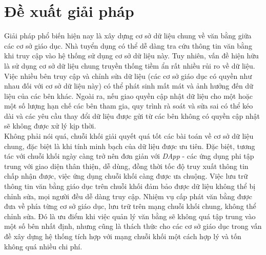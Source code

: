 \section{Đề xuất giải pháp}

Giải pháp phổ biến hiện nay là xây dựng cơ sở dữ liệu chung về văn bằng giữa các cơ sở giáo dục. Nhà tuyển dụng có thể dễ dàng tra cứu thông tin văn bằng khi truy cập vào hệ thống sử dụng cơ sở dữ liệu này. Tuy nhiên, vấn đề hiện hữu là sử dụng cơ sở dữ liệu chung truyền thống tiềm ẩn rất nhiều rủi ro về dữ liệu. Việc nhiều bên truy cập và chỉnh sửa dữ liệu (các cơ sở giáo dục có quyền như nhau đối với cơ sở dữ liệu này) có thể phát sinh mất mát và ảnh hưởng đến dữ liệu của các bên khác. Ngoài ra, nếu giao quyền cập nhật dữ liệu cho một hoặc một số lượng hạn chế các bên tham gia, quy trình rà soát và sửa sai có thể kéo dài và các yêu cầu thay đổi dữ liệu được gửi từ các bên không có quyền cập nhật sẽ không được xử lý kịp thời.\\

Không phải nói quá, chuỗi khối giải quyết quá tốt các bài toán về cơ sở dữ liệu chung, đặc biệt là khi tính minh bạch của dữ liệu được ưu tiên. Đặc biệt, tương tác với chuỗi khối ngày càng trở nên đơn giản với \textit{DApp} - các ứng dụng phi tập trung với giao diện thân thiện, dễ dùng, đồng thời tốc độ truy xuất thông tin chấp nhận được, việc ứng dụng chuỗi khối càng được ưa chuộng. Việc lưu trữ thông tin văn bằng giáo dục trên chuỗi khối đảm bảo được dữ liệu không thể bị chỉnh sửa, mọi người đều dễ dàng truy cập. Nhiệm vụ cấp phát văn bằng được đưa về phía từng cơ sở giáo dục, lưu trữ trên mạng chuỗi khối chung, không thể chỉnh sửa. Đó là ưu điểm khi việc quản lý văn bằng sẽ không quá tập trung vào một số bên nhất định, nhưng cũng là thách thức cho các cơ sở giáo dục trong vấn đề xây dựng hệ thống tích hợp với mạng chuỗi khối một cách hợp lý và tốn không quá nhiều chi phí.